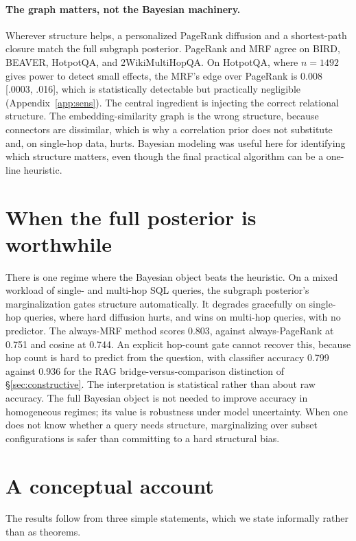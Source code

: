 \documentclass[11pt]{article}
\begin{document}
\paragraph{The graph matters, not the Bayesian machinery.} Wherever structure helps, a personalized
PageRank diffusion and a shortest-path closure match the full subgraph posterior. PageRank and MRF agree
on BIRD, BEAVER, HotpotQA, and 2WikiMultiHopQA. On HotpotQA, where $n=1492$ gives power to detect small
effects, the MRF's edge over PageRank is 0.008 [.0003, .016], which is statistically detectable but
practically negligible (Appendix~\ref{app:sens}). The central ingredient is injecting the correct
relational structure. The embedding-similarity graph is the wrong structure, because connectors are
dissimilar, which is why a correlation prior does not substitute and, on single-hop data, hurts.
Bayesian modeling was useful here for identifying which structure matters, even though the final
practical algorithm can be a one-line heuristic.

\section{When the full posterior is worthwhile}\label{sec:posterior}

There is one regime where the Bayesian object beats the heuristic. On a mixed workload of single- and
multi-hop SQL queries, the subgraph posterior's marginalization gates structure automatically. It
degrades gracefully on single-hop queries, where hard diffusion hurts, and wins on multi-hop queries,
with no predictor. The always-MRF method scores 0.803, against always-PageRank at 0.751 and cosine at
0.744. An explicit hop-count gate cannot recover this, because hop count is hard to predict from the
question, with classifier accuracy 0.799 against 0.936 for the RAG bridge-versus-comparison distinction
of \S\ref{sec:constructive}. The interpretation is statistical rather than about raw accuracy. The full
Bayesian object is not needed to improve accuracy in homogeneous regimes; its value is robustness under
model uncertainty. When one does not know whether a query needs structure, marginalizing over subset
configurations is safer than committing to a hard structural bias.

\section{A conceptual account}\label{sec:account}

The results follow from three simple statements, which we state informally rather than as theorems.
\end{document}
